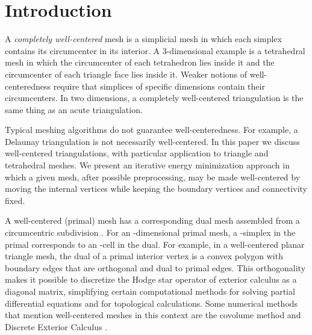 \documentclass[final]{siamltex}
\begin{document}
\section{Introduction}

A \emph{completely well-centered} mesh is a simplicial mesh in which
each simplex contains its circumcenter in its interior. A
3-dimensional example is a tetrahedral mesh in which the circumcenter
of each tetrahedron lies inside it and the circumcenter of each
triangle face lies inside it. Weaker notions of well-centeredness
  require that simplices of specific dimensions contain their
  circumcenters. In two dimensions, a completely well-centered
triangulation is the same thing as an acute triangulation.

Typical meshing algorithms do not guarantee well-centeredness. For
example, a Delaunay triangulation is not necessarily well-centered. In
this paper we discuss well-centered triangulations, with particular
application to triangle and tetrahedral meshes.  We present an
iterative energy minimization approach in which a given mesh, after
possible preprocessing, may be made well-centered by moving the
internal vertices while keeping the boundary vertices and connectivity
fixed.

A well-centered (primal) mesh has a corresponding dual mesh assembled
from a circumcentric subdivision \cite{Hirani2003}. For an
-dimensional primal mesh, a -simplex in the primal corresponds
to an -cell in the dual. For example, in a well-centered planar
triangle mesh, the dual of a primal interior vertex is a convex
polygon with boundary edges that are orthogonal and dual to primal
edges. This orthogonality makes it possible to discretize the Hodge
star operator of exterior calculus \cite{AbMaRa1988} as a diagonal
matrix, simplifying certain computational methods for solving partial
differential equations and for topological calculations. Some
numerical methods that mention well-centered meshes in this context
are the covolume method \cite{Nicolaides1992} and Discrete Exterior
Calculus \cite{Hirani2003,DeHiLeMa2005}.
\end{document}
